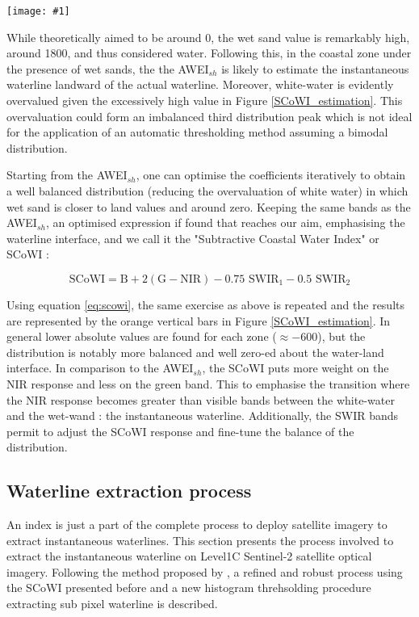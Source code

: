 \documentclass[remotesensing,article,submit,pdftex,moreauthors]{Definitions/mdpi}
\newcommand{\myfigure}[4]{
    \begin{figure*}[h!]
        \centering
        \texttt{[image: \#1]}	 
        \caption{\itshape#2}
        \label{#3}
    \end{figure*} 
}
\begin{document}
\myfigure{img/SCoWI_optimisation.png}{Comparison of the estimated values of the SCoWI (orange bars) against the AWEI$_{sh}$ (blue bars) over the 5 areas of the intertidal zone. The SCoWI has lower estimated values than AWEI$_{sh}$ on the white-water and wet sand area, optimising the extraction of the waterline.}{SCoWI_estimation}{0.5}

While theoretically aimed to be around 0, the wet sand value is remarkably high, around 1800, and thus considered water. Following this, in the coastal zone under the presence of wet sands, the the AWEI$_{sh}$ is likely to estimate the instantaneous waterline landward of the actual waterline. Moreover, white-water is evidently overvalued given the excessively high value in Figure \ref{SCoWI_estimation}. This overvaluation could form an imbalanced third distribution peak which is not ideal for the application of an automatic thresholding method assuming a bimodal distribution.

Starting from the AWEI$_{sh}$, one can optimise the coefficients iteratively to obtain a well balanced distribution (reducing the overvaluation of white water) in which wet sand is closer to land values and around zero. Keeping the same bands as the AWEI$_{sh}$, an optimised expression if found that reaches our aim, emphasising the waterline interface, and we call it the "Subtractive Coastal Water Index" or SCoWI : 

\begin{equation}
    \textrm{SCoWI} = \textrm{B} + 2(\textrm{G} - \textrm{NIR}) - 0.75 \textrm{ SWIR$_{1}$} - 0.5 \textrm{ SWIR$_{2}$}
    \label{eq:scowi}
\end{equation}

Using equation \ref{eq:scowi}, the same exercise as above is repeated and the results are represented by the orange vertical bars in Figure \ref{SCoWI_estimation}. In general lower absolute values are found for each zone ($\approx -600$), but the distribution is notably more balanced and well zero-ed about the water-land interface. In comparison to the AWEI$_{sh}$, the SCoWI puts more weight on the NIR response and less on the green band. This to emphasise the transition where the NIR response becomes greater than visible bands between the white-water and the wet-wand : the instantaneous waterline. Additionally, the SWIR bands permit to adjust the SCoWI response and fine-tune the balance of the distribution.
        
\subsection{Waterline extraction process}\label{extract_process}
An index is just a part of the complete process to deploy satellite imagery to extract instantaneous waterlines. This section presents the process involved to extract the instantaneous waterline on Level1C Sentinel-2 satellite optical imagery. Following the method proposed by \citep{Bishop_sub_pixel}, a refined and robust process using the SCoWI presented before and a new histogram threhsolding procedure extracting sub pixel waterline is described.
\end{document}
